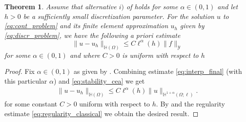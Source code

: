 \documentclass[11 pt]{article}
\newtheorem{theorem}{Theorem}[section]
\numberwithin{equation}{section}
\def\N{\mathbb{N}}
\def\R{\mathbb{R}}
\def\cH{\mathcal{H}}
\begin{document}
\begin{theorem}
    Assume that alternative $i)$ of  holds for some $\alpha\in(0,1)$ and let $h>0$ be a sufficiently small discretization parameter. For the solution $u$ to \eqref{eq:cont_problem} and its finite element approximation $u_h$ given by \eqref{eq:discr_problem}, we have the following a priori estimate
    \begin{equation}
        \|u-u_h\|_{\mathbb H(\Omega)}\leq C\ell^{\alpha}(h)\|f\|_{\mathcal Y}
    \end{equation}
    for some $\alpha\in(0,1)$ and where $C>0$ is uniform with respect to $h$ 
\end{theorem}

\begin{proof}
Fix $\alpha\in(0,1)$ as given by . Combining estimate \eqref{eq:interp_final} (with this particular $\alpha$) and \eqref{eq:stability_cea} we get
%
\begin{align}
    \|u-u_h\|_{\mathbb H(\Omega)}\leq C\ell^{\alpha}(h)\|u\|_{\mathbb{H}^{1+\alpha}(\Omega;\ell)}.
\end{align}
%
for some constant $C>0$ uniform with respect to $h$. By  and the regularity estimate \eqref{eq:regularity_classical} we obtain the desired result.
\end{proof}




\end{document}
